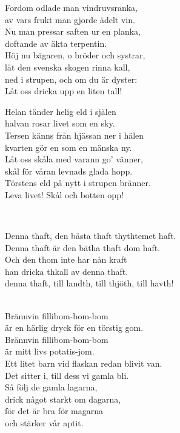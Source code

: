 Fordom odlade man vindruvsranka,\\
av vars frukt man gjorde ädelt vin.\\
Nu man pressar saften ur en planka,\\
doftande av äkta terpentin.\\
Höj nu bägaren, o bröder och systrar,\\
låt den svenska skogen rinna kall,\\
ned i strupen, och om du är dyster:\\
Låt oss dricka upp en liten tall!

Helan tänder helig eld i själen\\
halvan rosar livet som en sky.\\
Tersen känns från hjässan ner i hälen\\
kvarten gör en som en mänska ny.\\
Låt oss skåla med varann go' vänner,\\
skål för våran levnads glada hopp.\\
Törstens eld på nytt i strupen bränner.\\
Leva livet! Skål och botten opp!

\newpage 


 \\       

\songtext{}
Denna thaft, den bästa thaft thythtemet haft. \\
Denna thaft är den bätha thaft dom haft. \\
Och den thom inte har nån kraft \\
han dricka thkall av denna thaft. \\
denna thaft, till landth, till thjöth, till havth! \\


 \\       

\songtext{}Brännvin fillibom-bom-bom \\
är en härlig dryck för en törstig gom. \\
Brännvin fillibom-bom-bom \\
är mitt livs potatis-jom. \\
Ett litet barn vid flaskan redan blivit van. \\
Det sitter i, till dess vi gamla bli. \\
Så följ de gamla lagarna, \\
drick något starkt om dagarna, \\
för det är bra för magarna \\
och stärker vår aptit. \\

